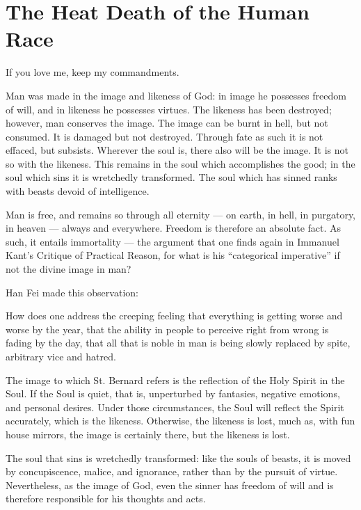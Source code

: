 \section{The Heat Death of the Human Race}

\begin{quotex}
If you love me, keep my commandments.

Man was made in the image and likeness of God: in image he possesses freedom of will, and in likeness he possesses virtues. The likeness has been destroyed; however, man conserves the image. The image can be burnt in hell, but not consumed. It is damaged but not destroyed. Through fate as such it is not effaced, but subsists. Wherever the soul is, there also will be the image. It is not so with the likeness. This remains in the soul which accomplishes the good; in the soul which sins it is wretchedly transformed. The soul which has sinned ranks with beasts devoid of intelligence.

Man is free, and remains so through all eternity --- on earth, in hell, in purgatory, in heaven --- always and everywhere. Freedom is therefore an absolute fact. As such, it entails immortality --- the argument that one finds again in Immanuel Kant's Critique of Practical Reason, for what is his ``categorical imperative'' if not the divine image in man?
\end{quotex}


Han Fei made this observation:

\begin{quotex}
How does one address the creeping feeling that everything is getting worse and worse by the year, that the ability in people to perceive right from wrong is fading by the day, that all that is noble in man is being slowly replaced by spite, arbitrary vice and hatred.
\end{quotex}


The image to which St. Bernard refers is the reflection of the Holy Spirit in the Soul. If the Soul is quiet, that is, unperturbed by fantasies, negative emotions, and personal desires. Under those circumstances, the Soul will reflect the Spirit accurately, which is the likeness. Otherwise, the likeness is lost, much as, with fun house mirrors, the image is certainly there, but the likeness is lost.

The soul that sins is wretchedly transformed: like the souls of beasts, it is moved by concupiscence, malice, and ignorance, rather than by the pursuit of virtue. Nevertheless, as the image of God, even the sinner has freedom of will and is therefore responsible for his thoughts and acts.


